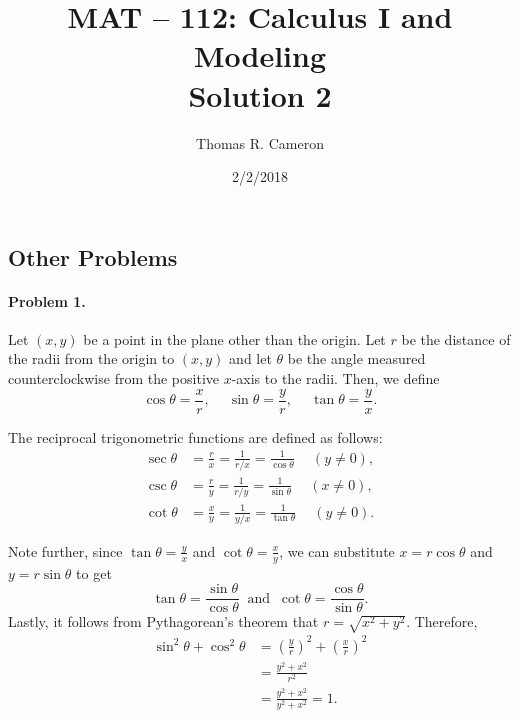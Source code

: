 \documentclass{article}
\title{MAT -- 112: Calculus I and Modeling\\
\large{Solution 2}}
\author{Thomas R. Cameron}
\date{2/2/2018}
\begin{document}
\maketitle

\subsection*{Other Problems}

\paragraph*{Problem 1.}	Let $(x,y)$ be a point in the plane other than the origin. Let $r$ be the distance of the radii from the origin to $(x,y)$ and let $\theta$ be the angle measured counterclockwise from the positive $x$-axis to the radii. Then, we define
\[
\cos\theta=\frac{x}{r},~\quad\sin\theta=\frac{y}{r},~\quad\tan\theta=\frac{y}{x}.
\]

The reciprocal trigonometric functions are defined as follows:
\begin{align*}
\sec\theta&=\frac{r}{x}=\frac{1}{r/x}=\frac{1}{\cos\theta}~\quad(y\neq 0),\\
\csc\theta&=\frac{r}{y}=\frac{1}{r/y}=\frac{1}{\sin\theta}~\quad(x\neq 0),\\
\cot\theta&=\frac{x}{y}=\frac{1}{y/x}=\frac{1}{\tan\theta}~\quad(y\neq 0).
\end{align*}

Note further, since $\tan\theta=\frac{y}{x}$ and $\cot\theta=\frac{x}{y}$, we can substitute $x=r\cos\theta$ and $y=r\sin\theta$ to get
\[
\tan\theta=\frac{\sin\theta}{\cos\theta}~\text{ and }~\cot\theta=\frac{\cos\theta}{\sin\theta}.
\]
Lastly, it follows from Pythagorean's theorem that $r=\sqrt{x^{2}+y^{2}}$. Therefore,
\begin{align*}
\sin^{2}\theta+\cos^{2}\theta&=\left(\frac{y}{r}\right)^{2}+\left(\frac{x}{r}\right)^{2} \\
&=\frac{y^{2}+x^{2}}{r^{2}} \\
&=\frac{y^{2}+x^{2}}{y^{2}+x^{2}}=1.
\end{align*}
\end{document}
